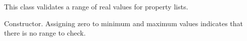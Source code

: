 \section{}\label{wxreallistvalidator}


This class validates a range of real values for property lists.



Constructor. Assigning zero to minimum and maximum values indicates that there is no range to check.


